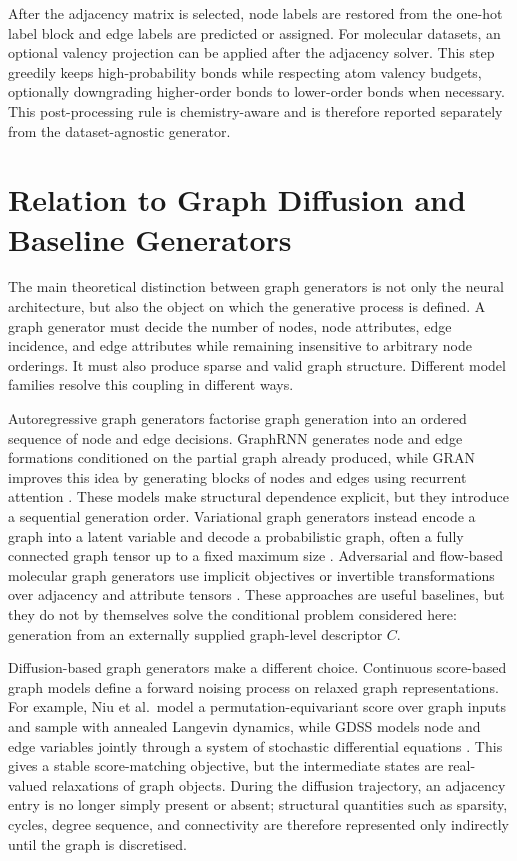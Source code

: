 After the adjacency matrix is selected, node labels are restored from the
one-hot label block and edge labels are predicted or assigned. For molecular
datasets, an optional valency projection can be applied after the adjacency
solver. This step greedily keeps high-probability bonds while respecting atom
valency budgets, optionally downgrading higher-order bonds to lower-order bonds
when necessary. This post-processing rule is chemistry-aware and is therefore
reported separately from the dataset-agnostic generator.

\section{Relation to Graph Diffusion and Baseline Generators}
\label{sec:generator:relation}

The main theoretical distinction between graph generators is not only the
neural architecture, but also the object on which the generative process is
defined. A graph generator must decide the number of nodes, node attributes,
edge incidence, and edge attributes while remaining insensitive to arbitrary
node orderings. It must also produce sparse and valid graph structure. Different
model families resolve this coupling in different ways.

Autoregressive graph generators factorise graph generation into an ordered
sequence of node and edge decisions. GraphRNN generates node and edge formations
conditioned on the partial graph already produced, while GRAN improves this
idea by generating blocks of nodes and edges using recurrent attention
\citep{you2018graphrnn,liao2019gran}. These models make structural dependence
explicit, but they introduce a sequential generation order. Variational graph
generators instead encode a graph into a latent variable and decode a
probabilistic graph, often a fully connected graph tensor up to a fixed maximum
size \citep{kipf2016vgae,simonovsky2018graphvae}. Adversarial and flow-based
molecular graph generators use implicit objectives or invertible
transformations over adjacency and attribute tensors
\citep{de2018molgan,madhawa2019graphnvp,zang2020moflow,lippe2020categorical}.
These approaches are useful baselines, but they do not by themselves solve the
conditional problem considered here: generation from an externally supplied
graph-level descriptor \(C\).

Diffusion-based graph generators make a different choice. Continuous
score-based graph models define a forward noising process on relaxed graph
representations. For example, Niu et al.\ model a permutation-equivariant score
over graph inputs and sample with annealed Langevin dynamics, while GDSS models
node and edge variables jointly through a system of stochastic differential
equations \citep{niu2020permutation,jo2022score}. This gives a stable
score-matching objective, but the intermediate states are real-valued
relaxations of graph objects. During the diffusion trajectory, an adjacency
entry is no longer simply present or absent; structural quantities such as
sparsity, cycles, degree sequence, and connectivity are therefore represented
only indirectly until the graph is discretised.

